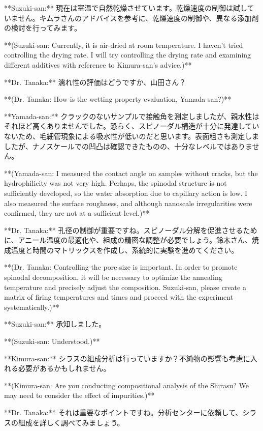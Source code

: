 \documentclass{article}
\begin{document}
**Suzuki-san:** 現在は室温で自然乾燥させています。乾燥速度の制御は試していません。キムラさんのアドバイスを参考に、乾燥速度の制御や、異なる添加剤の検討を行ってみます。

**(Suzuki-san: Currently, it is air-dried at room temperature. I haven't tried controlling the drying rate. I will try controlling the drying rate and examining different additives with reference to Kimura-san's advice.)**

**Dr. Tanaka:** 濡れ性の評価はどうですか、山田さん？

**(Dr. Tanaka: How is the wetting property evaluation, Yamada-san?)**

**Yamada-san:** クラックのないサンプルで接触角を測定しましたが、親水性はそれほど高くありませんでした。恐らく、スピノーダル構造が十分に発達していないため、毛細管現象による吸水性が低いのだと思います。表面粗さも測定しましたが、ナノスケールでの凹凸は確認できたものの、十分なレベルではありません。

**(Yamada-san: I measured the contact angle on samples without cracks, but the hydrophilicity was not very high. Perhaps, the spinodal structure is not sufficiently developed, so the water absorption due to capillary action is low. I also measured the surface roughness, and although nanoscale irregularities were confirmed, they are not at a sufficient level.)**

**Dr. Tanaka:** 孔径の制御が重要ですね。スピノーダル分解を促進させるために、アニール温度の最適化や、組成の精密な調整が必要でしょう。鈴木さん、焼成温度と時間のマトリックスを作成し、系統的に実験を進めてください。

**(Dr. Tanaka: Controlling the pore size is important. In order to promote spinodal decomposition, it will be necessary to optimize the annealing temperature and precisely adjust the composition. Suzuki-san, please create a matrix of firing temperatures and times and proceed with the experiment systematically.)**

**Suzuki-san:** 承知しました。

**(Suzuki-san: Understood.)**

**Kimura-san:** シラスの組成分析は行っていますか？不純物の影響も考慮に入れる必要があるかもしれません。

**(Kimura-san: Are you conducting compositional analysis of the Shirasu? We may need to consider the effect of impurities.)**

**Dr. Tanaka:** それは重要なポイントですね。分析センターに依頼して、シラスの組成を詳しく調べてみましょう。
\end{document}
